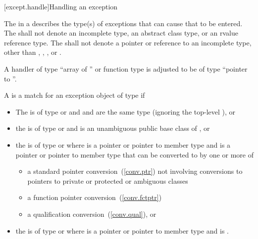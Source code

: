 [except.handle]{Handling an exception}
%

\pnum
The
in a
describes the type(s) of exceptions that can cause
that
to be entered.
%
%
%
%
The
shall not denote an incomplete type, an abstract class type, or an rvalue reference type.
The
shall not denote a pointer or reference to an
incomplete type, other than
,
,
,
or
.

\pnum
A handler of type
%
``array of '' or
%
function type 
is adjusted to be of type
``pointer to ''.

\pnum
{}%
A
is a match for
an exception object
of type
if
\begin{itemize}
\item%
The  is of type \cv{}  or
\cv{}  and
 and 
are the same type (ignoring the top-level ), or
\item%
the  is of type \cv{}  or
\cv{}  and
 is an unambiguous public base class of , or
\item%
the  is of type \cv{}  or 
where  is a pointer or pointer to member type and
 is a pointer or pointer to member type
that can be converted to  by one or more of
\begin{itemize}

\item%
a standard pointer conversion~(\ref{conv.ptr}) not involving conversions
to pointers to private or protected or ambiguous classes
\item%
a function pointer conversion~(\ref{conv.fctptr})
\item%
a qualification conversion~(\ref{conv.qual}), or

\end{itemize}

\item
the  is of type \cv{}  or  where  is a pointer or pointer to member type and  is .

\end{itemize}

